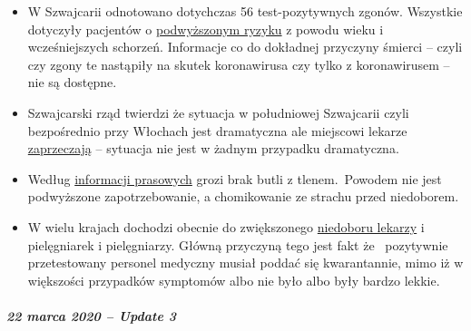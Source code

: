 \begin{itemize}
\tightlist
\item
  W Szwajcarii odnotowano dotychczas 56 test-pozytywnych zgonów.
  Wszystkie dotyczyły pacjentów o
  \href{https://www.nzz.ch/schweiz/coronavirus-in-der-schweiz-die-neusten-entwicklungen-ld.1542664\#subtitle-wie-viele-infizierte-und-todesf-lle-gibt-es-second}{podwyższonym
  ryzyku} z powodu wieku i wcześniejszych schorzeń. Informacje co do
  dokładnej przyczyny śmierci -- czyli czy zgony te nastąpiły na skutek
  koronawirusa czy tylko z koronawirusem -- nie są dostępne.
\item
  Szwajcarski rząd twierdzi że sytuacja w południowej Szwajcarii czyli
  bezpośrednio przy Włochach jest dramatyczna ale miejscowi lekarze
  \href{https://www.nzz.ch/schweiz/punkto-intensivbetten-sind-wir-im-tessin-besser-ausgeruestet-als-der-rest-der-schweiz-ld.1547728}{zaprzeczają}
  -- sytuacja nie jest w żadnym przypadku dramatyczna.
\item
  Według
  \href{https://www.blick.ch/news/schweiz/nicht-nur-beatmungsgeraete-werden-knapp-im-kampf-gegen-corona-es-droht-ein-engpass-beim-sauerstoff-id15808185.html}{informacji
  prasowych} grozi brak butli z tlenem.~Powodem nie jest podwyższone
  zapotrzebowanie, a chomikowanie ze strachu przed niedoborem.
\item
  W wielu krajach dochodzi obecnie do zwiększonego
  \href{https://www.washingtonpost.com/health/covid-19-hits-doctors-nurses-emts-threatening-health-system/2020/03/17/f21147e8-67aa-11ea-b313-df458622c2cc_story.html}{niedoboru
  lekarzy} i pielęgniarek i pielęgniarzy. Główną przyczyną tego jest
  fakt że~ pozytywnie przetestowany personel medyczny musiał poddać się
  kwarantannie, mimo iż w większości przypadków symptomów albo nie było
  albo były bardzo lekkie.
\end{itemize}

\hypertarget{22-marca-2020--update-3}{%
\subparagraph{\texorpdfstring{\textbf{22 marca 2020 -- Update
3}}{22 marca 2020 -- Update 3}}\label{22-marca-2020--update-3}}


